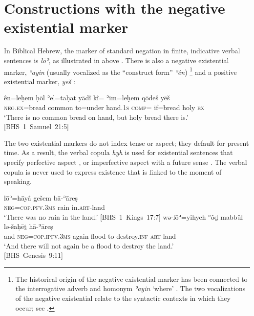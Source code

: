 ﻿\documentclass[output=paper]{langsci/langscibook}
\begin{document}
\section{Constructions with the negative existential
marker}\label{sec:Hebrew-2}

In Biblical Hebrew, the marker of standard negation in finite, indicative
verbal sentences is \textit{lōʾ}, as illustrated in
 above \parencite[see also][143--172]{Sjors2018}.
There is also a negative existential marker, \textit{ʾayin} (usually
vocalized as the ``construct form'' \textit{ʾên})%
%
    \footnote{The historical origin of the negative existential marker has
    been connected to the interrogative adverb and homonym \textit{ʾayin}
    `where' \parencite[see, e.g.][569]{JouonMuraoka2009}. The two
    vocalizations of the negative existential relate to the syntactic
    contexts in which they occur; see
    \cites{NaudeMiller2018}{NaudeMiller2019}.} 
%    
and a positive existential marker, \textit{yēš}
:
\begin{exe}\ex\label{ex:heb-just-holy-bread}
    \gll ên=leḥem ḥōl ʾel=taḥaṯ yāḏî kî= ʾim=leḥem qōḏeš yēš\\
\textsc{neg.ex}=bread common to=under   hand.1\textsc{s} \textsc{comp}=
if=bread holy \textsc{ex} \\
    \glt `There is no common bread on hand, but holy bread there is.'\\
\mbox{[BHS 1 Samuel 21:5]}
\end{exe}
%
The two existential markers do not index tense or aspect; they default for
present time. As a result, the verbal copula \textit{hyh} is used for
existential sentences that specify perfective aspect
, or imperfective aspect with a future sense
. The verbal copula is never used to express existence that is linked to the moment of speaking.
%
\begin{exe}\ex\begin{xlist}
\ex\label{ex:heb-land-without-rain}
\gll lōʾ=hāyâ g̱ešem bā-ʾāreṣ\\
\textsc{neg}=\textsc{cop.pfv.3ms} rain in.\textsc{art}-land  \\
\glt `There was no rain in the land.' \mbox{[BHS 1
Kings 17:7]}
%
\ex\label{ex:heb-no-flood-again}
\gll wǝ-lōʾ=yihyeh ʿôḏ mabbûl lǝ-šaḥēṯ hā-ʾāreṣ\\
and-\textsc{neg}=\textsc{cop.ipfv.3ms} again flood to-destroy.\textsc{inf}
\textsc{art}-land\\
\glt `And there will not again be a flood to destroy the land.'\\
\mbox{[BHS Genesis 9:11]}
\end{xlist}\end{exe}
\end{document}
